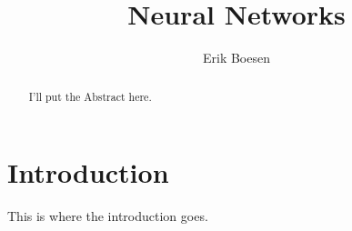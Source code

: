 \documentclass{article}
\begin{document}
\title{Neural Networks}
\author{Erik Boesen}

\maketitle

\begin{abstract}
I'll put the Abstract here.
\end{abstract}

\section{Introduction}
This is where the introduction goes.
\end{document}
